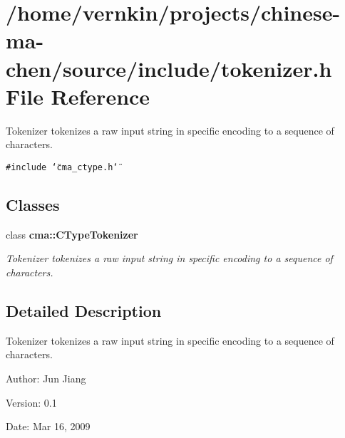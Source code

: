 \section{/home/vernkin/projects/chinese-ma-chen/source/include/tokenizer.h File Reference}
\label{tokenizer_8h}
Tokenizer tokenizes a raw input string in specific encoding to a sequence of characters.  


{\tt \#include \char`\"{}cma\_\-ctype.h\char`\"{}}\par
\subsection*{Classes}
\begin{CompactItemize}
\item 
class {\bf cma::CTypeTokenizer}
\begin{CompactList}\small\item\em Tokenizer tokenizes a raw input string in specific encoding to a sequence of characters. \item\end{CompactList}\end{CompactItemize}


\subsection{Detailed Description}
Tokenizer tokenizes a raw input string in specific encoding to a sequence of characters. 

\begin{Desc}
\item[Author:]Jun Jiang \end{Desc}
\begin{Desc}
\item[Version:]0.1 \end{Desc}
\begin{Desc}
\item[Date:]Mar 16, 2009 \end{Desc}
